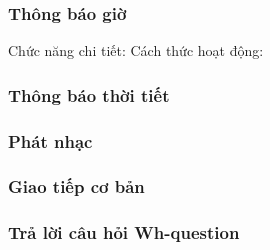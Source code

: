 \subsubsection{Thông báo giờ}
Chức năng chi tiết:
Cách thức hoạt động:
\subsubsection{Thông báo thời tiết}
\subsubsection{Phát nhạc}
\subsubsection{Giao tiếp cơ bản}
\subsubsection{Trả lời câu hỏi Wh-question}
